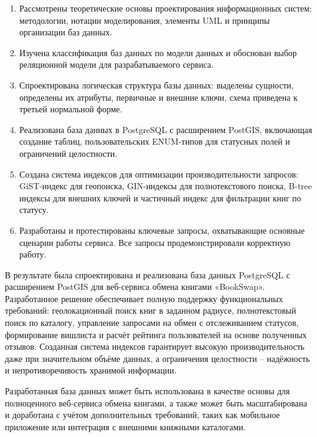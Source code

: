 \documentclass[14pt,a4paper]{extarticle}
\begin{document}
\begin{enumerate}
\def\labelenumi{\arabic{enumi}.}
\item
  Рассмотрены теоретические основы проектирования информационных систем:
  методологии, нотации моделирования, элементы UML и принципы
  организации баз данных.
\item
  Изучена классификация баз данных по модели данных и обоснован выбор
  реляционной модели для разрабатываемого сервиса.
\item
  Спроектирована логическая структура базы данных: выделены сущности,
  определены их атрибуты, первичные и внешние ключи, схема приведена к
  третьей нормальной форме.
\item
  Реализована база данных в PostgreSQL с расширением PostGIS, включающая
  создание таблиц, пользовательских ENUM-типов для статусных полей и
  ограничений целостности.
\item
  Создана система индексов для оптимизации производительности запросов:
  GiST-индекс для геопоиска, GIN-индексы для полнотекстового поиска,
  B-tree индексы для внешних ключей и частичный индекс для фильтрации
  книг по статусу.
\item
  Разработаны и протестированы ключевые запросы, охватывающие основные
  сценарии работы сервиса. Все запросы продемонстрировали корректную
  работу.
\end{enumerate}

В результате была спроектирована и реализована база данных PostgreSQL с
расширением PostGIS для веб-сервиса обмена книгами «BookSwap».
Разработанное решение обеспечивает полную поддержку функциональных
требований: геолокационный поиск книг в заданном радиусе, полнотекстовый
поиск по каталогу, управление запросами на обмен с отслеживанием
статусов, формирование вишлиста и расчёт рейтинга пользователей на
основе полученных отзывов. Созданная система индексов гарантирует
высокую производительность даже при значительном объёме данных, а
ограничения целостности -- надёжность и непротиворечивость хранимой
информации.

Разработанная база данных может быть использована в качестве основы для
полноценного веб-сервиса обмена книгами, а также может быть
масштабирована и доработана с учётом дополнительных требований, таких
как мобильное приложение или интеграция с внешними книжными каталогами.

\newpage
\renewcommand\refname{\centering Библиографический список}
\clearpage
{}
\end{document}

